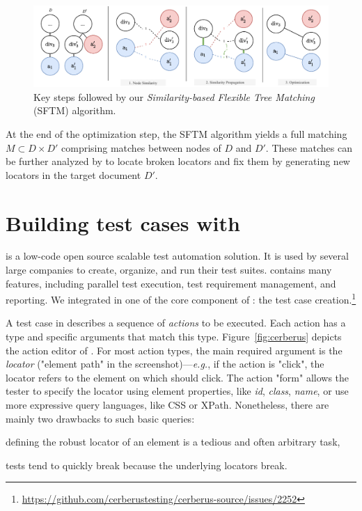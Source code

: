 \begin{figure}[!t]
    \centering
    \includegraphics[width=0.8\linewidth]{cerberus/explanations/sftm}
    \caption{Key steps followed by our \emph{Similarity-based Flexible Tree Matching} (SFTM) algorithm.}
    \label{fig:steps_sftm}
\end{figure}

At the end of the optimization step, the SFTM algorithm yields a full matching $M \subset D \times D' $ comprising matches between nodes of $D$ and $D'$.
These matches can be further analyzed by \erratum{} to locate broken locators and fix them by generating new locators in the target document $D'$.

\section{Building test cases with \cerberus}\label{sec:cerberus}
\cerberus is a low-code open source scalable test automation solution.
It is used by several large companies to create, organize, and run their test suites.
\cerberus contains many features, including parallel test execution, test requirement management, and reporting.
We integrated \erratum in one of the core component of \cerberus: the test case creation.\footnote{\url{https://github.com/cerberustesting/cerberus-source/issues/2252}}

A test case in \cerberus describes a sequence of \textit{actions} to be executed.
Each action has a type and specific arguments that match this type.
Figure~\ref{fig:cerberus} depicts the action editor of \cerberus.
For most action types, the main required argument is the \textit{locator} ("element path" in the screenshot)---\emph{e.g.}, if the action is "click", the locator refers to the element on which \cerberus should click.
The action "form" allows the tester to specify the locator using element properties, like \textit{id}, \textit{class}, \textit{name}, or use more expressive query languages, like CSS or XPath.
Nonetheless, there are mainly two drawbacks to such basic queries:
\begin{compactitem}
    \item defining the robust locator of an element is a tedious and often arbitrary task,
    \item tests tend to quickly break because the underlying locators break.
\end{compactitem}

